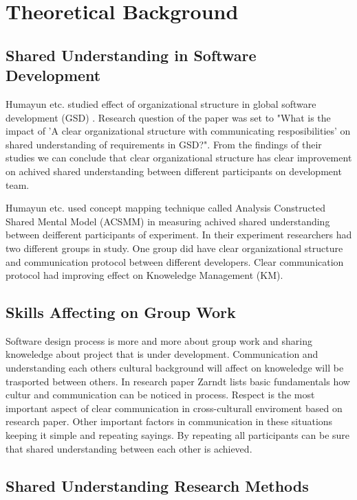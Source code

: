 \documentclass[english]{tktltiki2}
\theoremstyle{definition}
\theoremstyle{remark}
\begin{document}
\section{Theoretical Background}

\subsection{Shared Understanding in Software Development}

Humayun etc. studied effect of organizational structure in global software development (GSD) \cite{organizationalStructure}. Research question of the paper was set to "What is the impact of 'A clear organizational structure with communicating resposibilities' on shared understanding of requirements in GSD?". From the findings of their studies we can conclude that clear organizational structure has clear improvement on achived shared understanding between different participants on development team.

Humayun etc. used concept mapping technique called Analysis Constructed Shared Mental Model (ACSMM) in measuring achived shared understanding between deifferent participants of experiment. In their experiment researchers had two different groups in study. One group did have clear organizational structure and communication protocol between different developers. Clear communication protocol had improving effect on Knoweledge Management (KM)\cite{organizationalStructure}.

\subsection{Skills Affecting on Group Work}

Software design process is more and more about group work and sharing knoweledge about project that is under development. Communication and understanding each others cultural background will affect on knoweledge will be trasported between others. In research paper Zarndt lists basic fundamentals how cultur and communication can be noticed in process\cite{culturalCommunication}. Respect is the most important aspect of clear communication in cross-culturall enviroment based on research paper. Other important factors in communication in these situations keeping it simple and repeating sayings. By repeating all participants can be sure that shared understanding between each other is achieved\cite{culturalCommunication}.

\subsection{Shared Understanding Research Methods}
\end{document}
